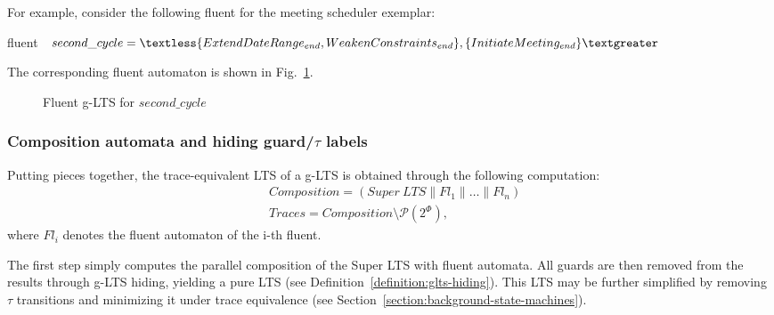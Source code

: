 For example, consider the following fluent for the meeting scheduler exemplar:
\begin{center}
fluent $second\_cycle = \newline \textless \{ ExtendDateRange_{end}, WeakenConstraints_{end} \}, \newline
 \{ InitiateMeeting_{end} \} \textgreater $\\
\end{center}

The corresponding fluent automaton is shown in Fig.~\ref{image:second-cycle-fluent-glts}.

\begin{figure}\centering
{}
\caption{Fluent g-LTS for $second\_cycle$\label{image:second-cycle-fluent-glts}}
\end{figure}

\subsubsection*{Composition automata and hiding guard/$\tau$ labels}

Putting pieces together, the trace-equivalent LTS of a g-LTS is obtained through the following computation:
\begin{align*}
&Composition = (Super~LTS \parallel Fl_1 \parallel \ldots \parallel Fl_n)\\
&Traces      = Composition \setminus \mathcal{P}(2^\Phi),
\end{align*}
where $Fl_i$ denotes the fluent automaton of the i-th fluent.

The first step simply computes the parallel composition of the Super LTS with fluent automata. All guards are then removed from the results through g-LTS hiding, yielding a pure LTS (see Definition~\ref{definition:glts-hiding}). This LTS may be further simplified by removing $\tau$ transitions and minimizing it under trace equivalence (see Section~\ref{section:background-state-machines}).

